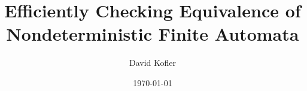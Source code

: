 \documentclass{clseminar}
\begin{document}
\title{Efficiently Checking Equivalence of Nondeterministic Finite Automata}
\author{David Kofler}
\date{\today}

\abstract{}

\maketitle

\tableofcontents



\appendix

\end{document}
